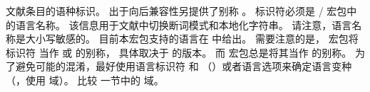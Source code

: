 \begin{fieldlist}



文献条目的语种标识。
出于向后兼容性另提供了别称 。
标识符必须是 / 宏包中的语言名称。
该信息用于文献中切换断词模式和本地化字符串。
请注意，语言名称是大小写敏感的。
目前本宏包支持的语言在 中给出。
需要注意的是， 宏包将标识符  当作  或  的别称，
具体取决于  的版本。
而 \biblatex 宏包总是将其当作  的别称。
为了避免可能的混淆，最好使用语言标识符  和 （）或者语言选项来确定语言变种
（，使用  域）。
比较  一节中的  域。






\end{fieldlist}
